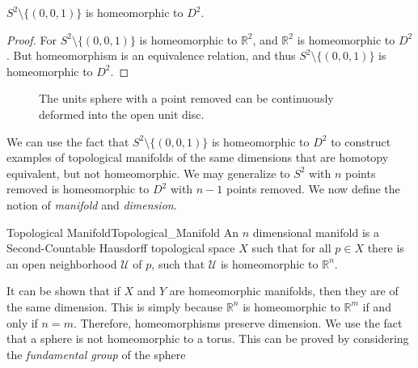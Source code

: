 \documentclass[crop=false,class=book,oneside]{standalone}                      %
\begin{document}
            \begin{theorem}
                $S^{2}\setminus\{(0,0,1)\}$ is homeomorphic to $D^{2}$.
            \end{theorem}
            \begin{proof}
                For $S^{2}\setminus\{(0,0,1)\}$ is homeomorphic to
                $\mathbb{R}^{2}$, and $\mathbb{R}^{2}$ is homeomorphic to
                $D^{2}$. But homeomorphism is an equivalence relation, and
                thus $S^{2}\setminus\{(0,0,1)\}$ is homeomorphic to $D^{2}$.
            \end{proof}
            \begin{figure}[H]
                \centering
                \captionsetup{type=figure}
                
                \caption[Homeomorphism Between $S^{2}\setminus\{(0,0,1)\}$%
                         and $D^{2}$.]
                        {The units sphere with a point removed can be
                         continuously deformed into the open unit disc.}
                \label{fig:homeomorphism_S_2_wo_North_Pole_and_R_2}
            \end{figure}
            We can use the fact that $S^{2}\setminus \{(0,0,1)\}$ is
            homeomorphic to $D^{2}$ to construct examples of topological
            manifolds of the same dimensions that are homotopy equivalent, but
            not homeomorphic. We may generalize to $S^{2}$ with $n$ points
            removed is homeomorphic to $D^{2}$ with $n-1$ points removed.
            We now define the notion of \textit{manifold} and
            \textit{dimension}.
            \begin{ldefinition}{Topological Manifold}{Topological_Manifold}
                An $n$ dimensional manifold is a Second-Countable Hausdorff
                topological space $X$ such that for all $p\in{X}$ there is an
                open neighborhood $\mathcal{U}$ of $p$, such that $\mathcal{U}$
                is homeomorphic to $\mathbb{R}^{n}$.
            \end{ldefinition}
            It can be shown that if $X$ and $Y$ are homeomorphic manifolds,
            then they are of the same dimension. This is simply because
            $\mathbb{R}^{n}$ is homeomorphic to $\mathbb{R}^{m}$ if and only if
            $n=m$. Therefore, homeomorphisms preserve dimension. We use the
            fact that a sphere is not homeomorphic to a torus. This can be
            proved by considering the \textit{fundamental group} of the sphere
\end{document}
